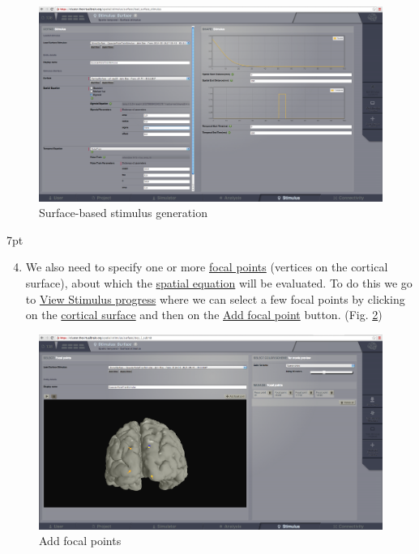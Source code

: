 \documentclass{tufte-handout}
\newenvironment{formal}{%
  \def\FrameCommand{%
    \hspace{1pt}%
    {\color{DarkBlue}\vrule width 2pt}%
    {\color{formalshade}\vrule width 4pt}%
    \colorbox{formalshade}%
  }%
  \MakeFramed{\advance\hsize-\width\FrameRestore}%
  \noindent\hspace{-4.55pt}%
  \begin{adjustwidth}{}{7pt}%
  \vspace{2pt}\vspace{2pt}%
}
{%
  \vspace{2pt}\end{adjustwidth}\endMakeFramed%
}
\begin{document}
\begin{figure}[h]
  \includegraphics[width=\linewidth]{Handout_UI_HeterogenousModelAndStimulation_StimulusSurface}%
  \caption{Surface-based stimulus generation}%
  \label{fig:surface_stimulus}%
\end{figure}

\begin{formal}
\begin{enumerate}
\setcounter{enumi}{3}
\item We also need to specify one or
more \underline{focal points} (vertices on the cortical surface), about which the
\underline{spatial equation} will be evaluated. To do this we go to \underline{View Stimulus progress} where we can select a few focal points by clicking on the \underline{cortical surface} and then on the \underline{Add focal point} button. (Fig. \ref{fig:focal_points})
\end{enumerate}
\end{formal}

\begin{figure}[h]
  \includegraphics[width=\linewidth]{Handout_UI_HeterogenousModelAndStimulation_StimulusSurfaceFocalPoints}%
  \caption{Add focal points}%
  \label{fig:focal_points}%
\end{figure}
\end{document}
